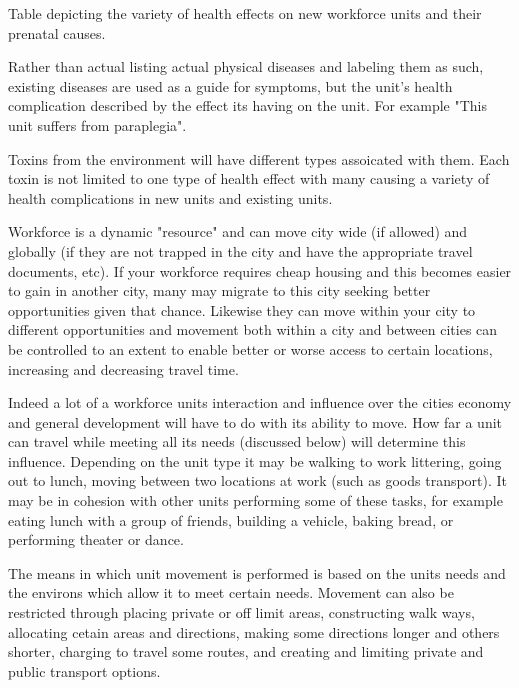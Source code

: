 Table depicting the variety of health effects on new workforce units and their prenatal causes.


Rather than actual listing actual physical diseases and labeling them as such, existing diseases are used as a guide for symptoms, but the unit's health complication described by the effect its having on the unit. For example "This unit suffers from paraplegia".



Toxins from the environment will have different types assoicated with them. Each toxin is not limited to one type of health effect with many causing a variety of health complications in new units and existing units.   



Workforce is a dynamic "resource" and can move city wide (if allowed) and globally (if they are not trapped in the city and have the appropriate travel documents, etc). If your workforce requires cheap housing and this becomes easier to gain in another city, many may migrate to this city seeking better opportunities given that chance. Likewise they can move within your city to different opportunities and movement both within a city and between cities can be controlled to an extent to enable better or worse access to certain locations, increasing and decreasing travel time.

Indeed a lot of a workforce units interaction and influence over the cities economy and general development will have to do with its ability to move. How far a unit can travel while meeting all its needs (discussed below) will determine this influence. Depending on the unit type it may be walking to work littering, going out to lunch, moving between two locations at work (such as goods transport). It may be in cohesion with other units performing some of these tasks, for example eating lunch with a group of friends, building a vehicle, baking bread, or performing theater or dance. 

The means in which unit movement is performed is based on the units needs and the environs which allow it to meet certain needs. Movement can also be restricted through placing private or off limit areas, constructing walk ways, allocating cetain areas and directions, making some directions longer and others shorter, charging to travel some routes, and creating and limiting private and public transport options. 



